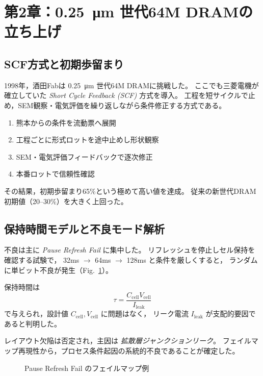 \documentclass[conference]{IEEEtran}
\let\meter\metre
\begin{document}
\section{第2章：\texorpdfstring{\SI{0.25}{\micro\meter}}{0.25μm} 世代64M DRAMの立ち上げ}

\subsection{SCF方式と初期歩留まり}
1998年，酒田Fabは \SI{0.25}{\micro\meter} 世代64M DRAMに挑戦した。
ここでも三菱電機が確立していた \emph{Short Cycle Feedback (SCF)} 方式を導入。
工程を短サイクルで止め，SEM観察・電気評価を繰り返しながら条件修正する方式である。

\begin{enumerate}
  \item 熊本からの条件を流動票へ展開
  \item 工程ごとに形式ロットを途中止めし形状観察
  \item SEM・電気評価フィードバックで逐次修正
  \item 本番ロットで信頼性確認
\end{enumerate}

その結果，初期歩留まり65\%という極めて高い値を達成。
従来の新世代DRAM初期値（20--30\%）を大きく上回った。

\subsection{保持時間モデルと不良モード解析}
不良は主に \emph{Pause Refresh Fail} に集中した。
リフレッシュを停止しセル保持を確認する試験で，
32ms $\rightarrow$ 64ms $\rightarrow$ 128ms と条件を厳しくすると，
ランダムに単ビット不良が発生（Fig.~\ref{fig:failmap}）。

保持時間は
\[
\tau = \frac{C_{\mathrm{cell}} V_{\mathrm{cell}}}{I_{\mathrm{leak}}}
\]
で与えられ，設計値 $C_{\mathrm{cell}}, V_{\mathrm{cell}}$ に問題はなく，
リーク電流 $I_{\mathrm{leak}}$ が支配的要因であると判明した。

レイアウト欠陥は否定され，主因は \emph{拡散層ジャンクションリーク}。
フェイルマップ再現性から，プロセス条件起因の系統的不良であることが確定した。

\begin{figure}[t]
\centering
{}
\caption{Pause Refresh Fail のフェイルマップ例}
\label{fig:failmap}
\end{figure}
\end{document}
